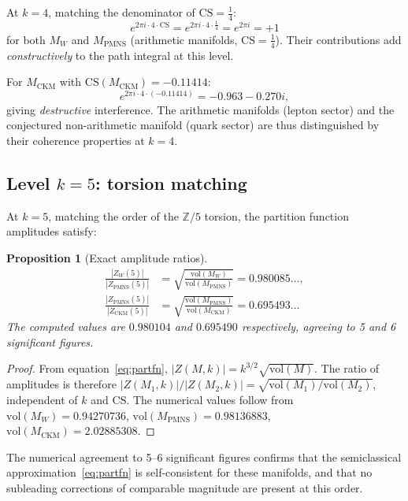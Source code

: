 \documentclass[12pt]{article}
\newtheorem{proposition}[theorem]{Proposition}
\theoremstyle{definition}
\begin{document}
At $k=4$, matching the denominator of $\mathrm{CS} = \tfrac{1}{4}$:
\[
  e^{2\pi i \cdot 4 \cdot \mathrm{CS}} = e^{2\pi i \cdot 4 \cdot
  \tfrac{1}{4}} = e^{2\pi i} = +1
\]
for both $M_W$ and $M_\mathrm{PMNS}$ (arithmetic manifolds,
$\mathrm{CS} = \tfrac{1}{4}$). Their contributions add
\emph{constructively} to the path integral at this level.

For $M_\mathrm{CKM}$ with $\mathrm{CS}(M_\mathrm{CKM}) = -0.11414$:
\[
  e^{2\pi i \cdot 4 \cdot (-0.11414)} = -0.963 - 0.270i,
\]
giving \emph{destructive} interference. The arithmetic manifolds
(lepton sector) and the conjectured non-arithmetic manifold (quark
sector) are thus distinguished by their coherence properties at $k=4$.

\subsection{Level $k = 5$: torsion matching}

At $k=5$, matching the order of the $\mathbb{Z}/5$ torsion, the
partition function amplitudes satisfy:

\begin{proposition}[Exact amplitude ratios]
\label{prop:amplitudes}
\begin{align}
  \frac{|Z_W(5)|}{|Z_\mathrm{PMNS}(5)|}
  &= \sqrt{\frac{\mathrm{vol}(M_W)}{\mathrm{vol}(M_\mathrm{PMNS})}}
  = 0.980085\ldots, \label{eq:ratio1}\\[4pt]
  \frac{|Z_\mathrm{PMNS}(5)|}{|Z_\mathrm{CKM}(5)|}
  &= \sqrt{\frac{\mathrm{vol}(M_\mathrm{PMNS})}
  {\mathrm{vol}(M_\mathrm{CKM})}}
  = 0.695493\ldots \label{eq:ratio2}
\end{align}
The computed values are $0.980104$ and $0.695490$ respectively,
agreeing to 5 and 6 significant figures.
\end{proposition}

\begin{proof}
From equation~\eqref{eq:partfn}, $|Z(M,k)| = k^{3/2}\sqrt{\mathrm{vol}(M)}$.
The ratio of amplitudes is therefore
$|Z(M_1,k)|/|Z(M_2,k)| = \sqrt{\mathrm{vol}(M_1)/\mathrm{vol}(M_2)}$,
independent of $k$ and $\mathrm{CS}$. The numerical values follow from
$\mathrm{vol}(M_W) = 0.94270736$, $\mathrm{vol}(M_\mathrm{PMNS}) =
0.98136883$, $\mathrm{vol}(M_\mathrm{CKM}) = 2.02885308$.
\end{proof}

The numerical agreement to 5--6 significant figures confirms that the
semiclassical approximation~\eqref{eq:partfn} is self-consistent for
these manifolds, and that no subleading corrections of comparable
magnitude are present at this order.
\end{document}
